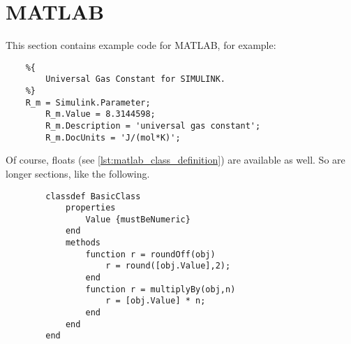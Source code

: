 \section{MATLAB}

This section contains example code for MATLAB, for example:
\begin{verbatim}
    %{
        Universal Gas Constant for SIMULINK.
    %}
    R_m = Simulink.Parameter;
        R_m.Value = 8.3144598;
        R_m.Description = 'universal gas constant';
        R_m.DocUnits = 'J/(mol*K)';
\end{verbatim}
Of course, floats (see \cref{lst:matlab_class_definition}) are available as well.
So are longer sections, like the following.

\begin{listing}
    \begin{verbatim}
        classdef BasicClass
            properties
                Value {mustBeNumeric}
            end
            methods
                function r = roundOff(obj)
                    r = round([obj.Value],2);
                end
                function r = multiplyBy(obj,n)
                    r = [obj.Value] * n;
                end
            end
        end
    \end{verbatim}
    \caption[A class definition in MATLAB]{%
        A class definition in MATLAB, from \cite{mathworks_create_2020}%
    }
    \label{lst:matlab_class_definition}
\end{listing}

